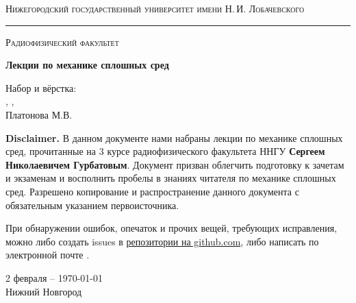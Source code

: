 \begin{titlepage}
\thispagestyle{empty}

\begin{center}
	{\small\textsc{Нижегородский государственный университет имени Н.\,И. Лобачевского}}
	\vskip 3pt \hrule \vskip 5pt
	{\small\textsc{Радиофизический факультет}}

	\vfill

	\begin{spacing}{2}
	{\Huge \bf  Лекции по механике сплошных сред}\\%
	\end{spacing}
	\vspace{1em}
	{ Набор и вёрстка:}\\[.5em]
	{ 
		\href{https://github.com/fedorsarafanov}{\color{black}{Сарафанов Ф.Г.}}, 
		\href{https://github.com/greengrocer98}{\color{black}{Есюнин М.В.}},
	\\ Платонова М.В.}\\[2em]
	\vspace{1em}
\end{center}

\textbf{Disclaimer.} В данном документе нами набраны лекции по механике сплошных сред, прочитанные на 3 курсе радиофизического факультета ННГУ \textbf{Сергеем Николаевичем Гурбатовым}. Документ призван облегчить подготовку к зачетам и экзаменам и восполнить пробелы в знаниях читателя по механике сплошных сред. Разрешено копирование и распространение данного документа с обязательным указанием первоисточника. 

При обнаружении ошибок, опечаток и прочих вещей, требующих исправления, можно либо создать issues в \href{https://github.com/FedorSarafanov/continuum-mechanics}{репозитории на github.com}, либо написать по электронной почте  \href{mailto:sfg180@yandex.ru}{\color{black}{sfg180@yandex.ru}}.

\begin{center}
	\vfill
	2 февраля -- \today\\Нижний Новгород
\end{center}

\end{titlepage}
